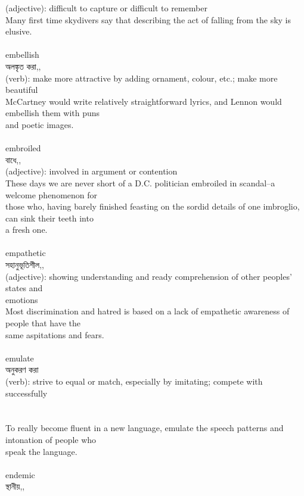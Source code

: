 \documentclass{article}
\begin{document}
{(adjective): difficult to capture or difficult to remember\\Many first time skydivers say that describing the act of falling from the sky is elusive.\\}\\
{embellish}\\
{অলঙ্কৃত করা,,}\\
{(verb): make more attractive by adding ornament, colour, etc.; make more beautiful\\McCartney would write relatively straightforward lyrics, and Lennon would embellish them with puns\\and poetic images.\\}\\
{embroiled}\\
{বাধে,,}\\
{(adjective): involved in argument or contention\\These days we are never short of a D.C. politician embroiled in scandal--a welcome phenomenon for\\those who, having barely finished feasting on the sordid details of one imbroglio, can sink their teeth into\\a fresh one.\\}\\
{empathetic}\\
{সহানুভূতিশীল,,}\\
{(adjective): showing understanding and ready comprehension of other peoples' states and\\emotions\\Most discrimination and hatred is based on a lack of empathetic awareness of people that have the\\same aspitations and fears.\\}\\
{emulate}\\
{অনুকরণ করা}\\
{(verb): strive to equal or match, especially by imitating; compete with successfully\\\\                                                                               \\To really become fluent in a new language, emulate the speech patterns and intonation of people who\\speak the language.\\}\\
{endemic}\\
{স্থানীয়,,}\\
\end{document}
